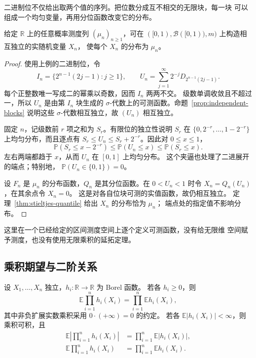 二进制位不仅给出取两个值的序列。把位数分成互不相交的无限块，每一块
可以组成一个均匀变量，再用分位函数改变它的分布。

\begin{proposition}[指定分布的独立序列]
\label{prop:independent-sequence-realization}
给定 $\mathbb R$ 上的任意概率测度列 $(\mu_n)_{n\ge1}$，可在
$([0,1),\mathcal B([0,1)),m)$ 上构造相互独立的实随机变量 $X_n$，
使每个 $X_n$ 的分布为 $\mu_n$。
\end{proposition}

\begin{proof}
使用上例的二进制位，令
\[
 I_n=\{2^{n-1}(2j-1):j\ge1\},\qquad
 U_n=\sum_{j=1}^{\infty}2^{-j}D_{2^{n-1}(2j-1)}.
\]
每个正整数唯一写成二的幂乘以奇数，因而 $I_n$ 两两不交。
级数单调收敛且不超过一，所以 $U_n$ 是由第 $I_n$ 块生成的
$\sigma$-代数上的可测函数。命题~\ref{prop:independent-blocks}
说明这些 $\sigma$-代数相互独立，故 $(U_n)$ 相互独立。

固定 $n$，记级数前 $r$ 项之和为 $S_r$。有限位的独立性说明
$S_r$ 在 $\{0,2^{-r},\ldots,1-2^{-r}\}$ 上均匀分布，而且逐点有
$S_r\le U_n\le S_r+2^{-r}$。因此对 $0\le x\le1$，
\[
 \mathbb P(S_r\le x-2^{-r})
 \le\mathbb P(U_n\le x)\le\mathbb P(S_r\le x).
\]
左右两端都趋于 $x$，从而 $U_n$ 在 $[0,1]$ 上均匀分布。
这个夹逼也处理了二进展开的端点；特别地，
$\mathbb P(U_n\in\{0,1\})=0$。

设 $F_n$ 是 $\mu_n$ 的分布函数，$Q_n$ 是其分位函数。在
$0<U_n<1$ 时令 $X_n=Q_n(U_n)$，在其余点令 $X_n=0$。
这是对各自位块可测的实值函数，故仍相互独立。
定理~\ref{thm:stieltjes-quantile} 给出 $X_n$ 的分布恰为 $\mu_n$；
端点处的指定值不影响分布。
\end{proof}

这里在一个已经给定的区间测度空间上逐个定义可测函数，没有给无限维
空间赋予测度，也没有使用无限乘积的延拓定理。

\subsection{乘积期望与二阶关系}

\begin{theorem}[独立变量的乘积期望]
\label{thm:independent-product-expectation}
设 $X_1,\ldots,X_n$ 独立，$h_i:\mathbb R\to\mathbb R$ 为 Borel 函数。
若各 $h_i\ge0$，则
\[
 \mathbb E\prod_{i=1}^nh_i(X_i)=\prod_{i=1}^n\mathbb E h_i(X_i),
\]
其中非负扩展实数乘积采用 $0\cdot(+\infty)=0$ 的约定。
若各 $\mathbb E|h_i(X_i)|<\infty$，则乘积可积，且
\begin{align*}
 \mathbb E\left|\prod_{i=1}^nh_i(X_i)\right|
 &=\prod_{i=1}^n\mathbb E|h_i(X_i)|,\\
 \mathbb E\prod_{i=1}^nh_i(X_i)&=\prod_{i=1}^n\mathbb E h_i(X_i).
\end{align*}
\end{theorem}

